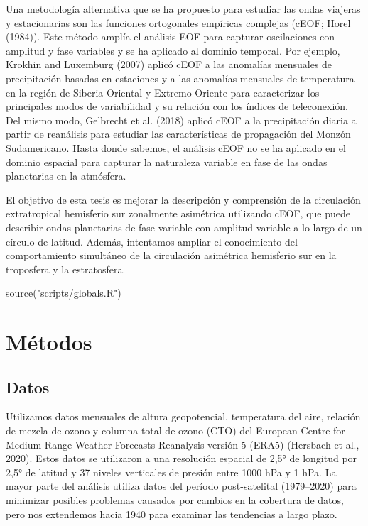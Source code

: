 \documentclass[12pt,oneside]{reedthesis}
\newenvironment{Shaded}{\begin{snugshade}}{\end{snugshade}}
\newcommand{\FunctionTok}[1]{\textcolor[rgb]{0.00,0.00,0.00}{#1}}
\newcommand{\NormalTok}[1]{#1}
\newcommand{\StringTok}[1]{\textcolor[rgb]{0.31,0.60,0.02}{#1}}
\begin{document}
Una metodología alternativa que se ha propuesto para estudiar las ondas viajeras y estacionarias son las funciones ortogonales empíricas complejas (cEOF; Horel (1984)).
Este método amplía el análisis EOF para capturar oscilaciones con amplitud y fase variables y se ha aplicado al dominio temporal.
Por ejemplo, Krokhin and Luxemburg (2007) aplicó cEOF a las anomalías mensuales de precipitación basadas en estaciones y a las anomalías mensuales de temperatura en la región de Siberia Oriental y Extremo Oriente para caracterizar los principales modos de variabilidad y su relación con los índices de teleconexión.
Del mismo modo, Gelbrecht et al. (2018) aplicó cEOF a la precipitación diaria a partir de reanálisis para estudiar las características de propagación del Monzón Sudamericano.
Hasta donde sabemos, el análisis cEOF no se ha aplicado en el dominio espacial para capturar la naturaleza variable en fase de las ondas planetarias en la atmósfera.

El objetivo de esta tesis es mejorar la descripción y comprensión de la circulación extratropical hemisferio sur zonalmente asimétrica utilizando cEOF, que puede describir ondas planetarias de fase variable con amplitud variable a lo largo de un círculo de latitud.
Además, intentamos ampliar el conocimiento del comportamiento simultáneo de la circulación asimétrica hemisferio sur en la troposfera y la estratosfera.

\begin{Shaded}
\begin{Highlighting}[]
\FunctionTok{source}\NormalTok{(}\StringTok{"scripts/globals.R"}\NormalTok{)}
\end{Highlighting}
\end{Shaded}

\hypertarget{muxe9todos}{%
\chapter{Métodos}\label{muxe9todos}}

\hypertarget{datos}{%
\section{Datos}\label{datos}}

Utilizamos datos mensuales de altura geopotencial, temperatura del aire, relación de mezcla de ozono y columna total de ozono (CTO) del European Centre for Medium-Range Weather Forecasts Reanalysis versión 5 (ERA5) (Hersbach et al., 2020).
Estos datos se utilizaron a una resolución espacial de 2,5° de longitud por 2,5° de latitud y 37 niveles verticales de presión entre 1000 hPa y 1 hPa.
La mayor parte del análisis utiliza datos del período post-satelital (1979--2020) para minimizar posibles problemas causados por cambios en la cobertura de datos, pero nos extendemos hacia 1940 para examinar las tendencias a largo plazo.
\end{document}

